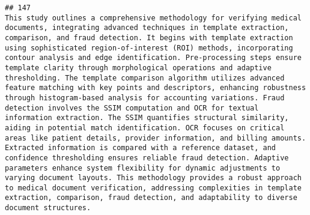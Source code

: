\documentclass[
]{article}
\begin{document}
\begin{verbatim}
## 147                                                                                                                                                                                                                                                                                                                                                                                                                                                                                                                                                                                                                 This study outlines a comprehensive methodology for verifying medical documents, integrating advanced techniques in template extraction, comparison, and fraud detection. It begins with template extraction using sophisticated region-of-interest (ROI) methods, incorporating contour analysis and edge identification. Pre-processing steps ensure template clarity through morphological operations and adaptive thresholding. The template comparison algorithm utilizes advanced feature matching with key points and descriptors, enhancing robustness through histogram-based analysis for accounting variations. Fraud detection involves the SSIM computation and OCR for textual information extraction. The SSIM quantifies structural similarity, aiding in potential match identification. OCR focuses on critical areas like patient details, provider information, and billing amounts. Extracted information is compared with a reference dataset, and confidence thresholding ensures reliable fraud detection. Adaptive parameters enhance system flexibility for dynamic adjustments to varying document layouts. This methodology provides a robust approach to medical document verification, addressing complexities in template extraction, comparison, fraud detection, and adaptability to diverse document structures.

\end{verbatim}
\end{document}
